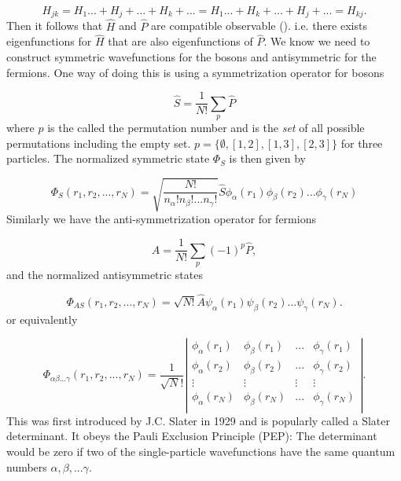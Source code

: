 \begin{equation}
H_{jk} = H_1... + H_j + ... + H_k + ... = H_1... + H_k + ... + H_j + ... = H_{kj}.
 \label{eq:HkjequalsHjk}
\end{equation}
%
Then it follows that $\hat{H}$ and $\hat{P}$ are compatible observable (\cite{griffiths}). i.e. there exists eigenfunctions for $\hat{H}$ that are also eigenfunctions of $\hat{P}$. We know we need to construct symmetric wavefunctions for the bosons and antisymmetric for the fermions. One way of doing this is using a symmetrization operator for bosons

\begin{equation}
\hat{S} = \frac{1}{N!} \sum_p \hat{P}
 \label{def:symmetrizer}
\end{equation}
%
where $p$ is the called the permutation number and is the \emph{set} of all possible permutations including the empty set. $p = \{\emptyset,[1,2],[1,3],[2,3]\}$  for three particles.
The normalized symmetric state $\Phi_S$ is then given by

\begin{equation}
\Phi_S(r_1,r_2,...,r_N) = \sqrt{\frac{N!}{n_\alpha!n_\beta!...n_\gamma!}} \hat{S} \phi_\alpha(r_1)\phi_\beta(r_2)...\phi_\gamma(r_N)
 \label{def:symmetricwave}
\end{equation}
%
Similarly we have the anti-symmetrization operator for fermions

\begin{equation}
\hat{A} = \frac{1}{N!} \sum_p (-1)^p \hat{P},
 \label{def:antisymmetrizer}
\end{equation}
%
and the normalized antisymmetric states

\begin{equation}
\Phi_{AS}(r_1,r_2,...,r_N) = \sqrt{N!} \hat{A} \psi_\alpha(r_1)\psi_\beta(r_2)...\psi_\gamma(r_N).
 \label{def:antisymmetricwave}
\end{equation}
%
or equivalently

\begin{equation}
  \Phi_{\alpha\beta...\gamma}(r_1,r_2,...,r_N) = \frac{1}{\sqrt N!} 
\left|\begin{array}{cccc} 
\phi_\alpha(r_1) & \phi_\beta(r_1) & ... & \phi_\gamma(r_1) \\
\phi_\alpha(r_2) & \phi_\beta(r_2) & ... & \phi_\gamma(r_2) \\
\vdots & \vdots & \vdots & \vdots \\
\phi_\alpha(r_N) & \phi_\beta(r_N) & ... & \phi_\gamma(r_N) \\
\end{array} \right|.
\label{def:slaterdeterminant}
\end{equation}
%
This was first introduced by J.C. Slater \cite{slaterdeterminant} in 1929 and is popularly called a Slater determinant. It obeys the Pauli Exclusion Principle (PEP): The determinant would be zero if two of the single-particle wavefunctions have the same quantum numbers $\alpha, \beta, ... \gamma$. 


